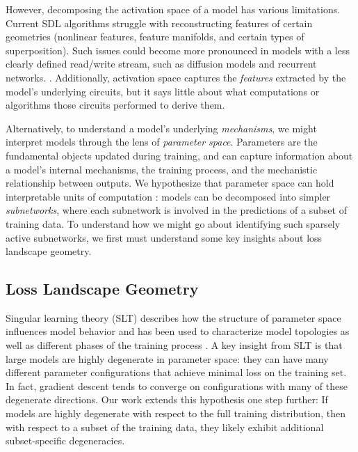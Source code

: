 \documentclass{article}
\theoremstyle{plain}
\theoremstyle{definition}
\theoremstyle{remark}
\begin{document}
However, decomposing the activation space of a model has various limitations.  Current SDL algorithms struggle with reconstructing features of certain geometries (nonlinear features, feature manifolds, and certain types of superposition)\cite{engels2024not,engels2024decomposing,merullo2024talking,lindsey2024sparse}. Such issues could become more pronounced in models with a less clearly defined read/write stream, such as diffusion models and recurrent networks. \cite{pascanu2013difficulty,ho2020denoising}.  Additionally, activation space captures the \textit{features} extracted by the model's underlying circuits, but it says little about what computations or algorithms those circuits performed to derive them.

Alternatively, to understand a model's underlying \textit{mechanisms}, we might interpret models through the lens of \textit{parameter space}. Parameters are the fundamental objects updated during training, and can capture information about a model's internal mechanisms, the training process, and the mechanistic relationship between outputs. We hypothesize that parameter space can hold interpretable units of computation \cite{sharkey2025open}: models can be decomposed into simpler \textit{subnetworks}, where each subnetwork is involved in the predictions of a subset of training data. To understand how we might go about identifying such sparsely active subnetworks, we first must understand some key insights about loss landscape geometry.


\subsection{Loss Landscape Geometry}\label{subsec:loss_landscape_geometry}

Singular learning theory (SLT) describes how the structure of parameter space influences model behavior \cite{watanabe2000algebraic,watanabe2005algebraic} and has been used to characterize model topologies \cite{bushnaq2024using,lau2023local} as well as different phases of the training process \cite{wang2024loss,hoogland2024developmental,davies2023unifying}. A key insight from SLT is that large models are highly degenerate \cite{wei2022deep,watanabe2007almost} in parameter space: they can have many different parameter configurations that achieve minimal loss on the training set. In fact, gradient descent tends to converge on configurations with many of these degenerate directions. Our work extends this hypothesis one step further: If models are highly degenerate with respect to the full training distribution, then with respect to a subset of the training data, they likely exhibit additional subset-specific degeneracies.
\end{document}
